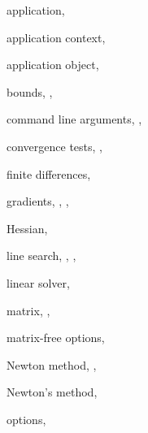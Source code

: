 \begin{theindex}

  \item application, 
  \item application context, 
  \item application object, 

  \indexspace

  \item bounds, , 

  \indexspace

  \item command line arguments, , 
  \item convergence tests, , 

  \indexspace

  \item finite differences, 

  \indexspace

  \item gradients, , , 

  \indexspace

  \item Hessian, 

  \indexspace

  \item line search, , , 
  \item linear solver, 

  \indexspace

  \item matrix, , 
  \item matrix-free options, 

  \indexspace

  \item Newton method, , 
  \item Newton's method, 

  \indexspace

  \item options, 

  \indexspace


\end{theindex}
